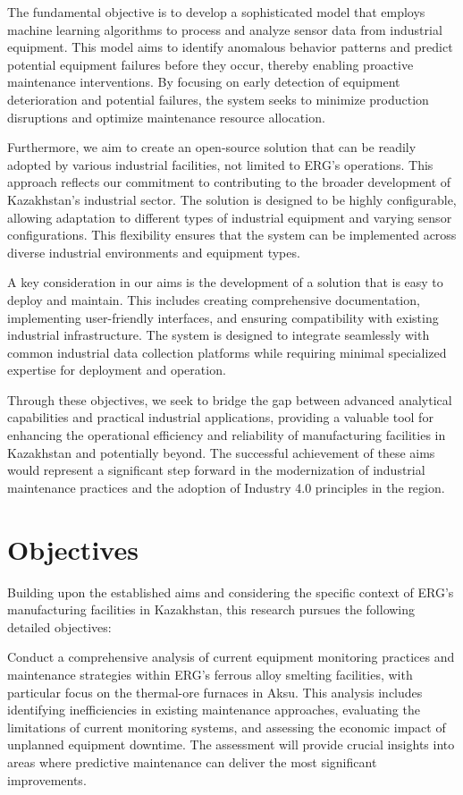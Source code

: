The fundamental objective is to develop a sophisticated model that employs machine learning algorithms to process and analyze sensor data from industrial equipment. This model aims to identify anomalous behavior patterns and predict potential equipment failures before they occur, thereby enabling proactive maintenance interventions. By focusing on early detection of equipment deterioration and potential failures, the system seeks to minimize production disruptions and optimize maintenance resource allocation.

Furthermore, we aim to create an open-source solution that can be readily adopted by various industrial facilities, not limited to ERG's operations. This approach reflects our commitment to contributing to the broader development of Kazakhstan's industrial sector. The solution is designed to be highly configurable, allowing adaptation to different types of industrial equipment and varying sensor configurations. This flexibility ensures that the system can be implemented across diverse industrial environments and equipment types.

A key consideration in our aims is the development of a solution that is easy to deploy and maintain. This includes creating comprehensive documentation, implementing user-friendly interfaces, and ensuring compatibility with existing industrial infrastructure. The system is designed to integrate seamlessly with common industrial data collection platforms while requiring minimal specialized expertise for deployment and operation.

Through these objectives, we seek to bridge the gap between advanced analytical capabilities and practical industrial applications, providing a valuable tool for enhancing the operational efficiency and reliability of manufacturing facilities in Kazakhstan and potentially beyond. The successful achievement of these aims would represent a significant step forward in the modernization of industrial maintenance practices and the adoption of Industry 4.0 principles in the region.

\section{Objectives}

Building upon the established aims and considering the specific context of ERG's manufacturing facilities in Kazakhstan, this research pursues the following detailed objectives:

Conduct a comprehensive analysis of current equipment monitoring practices and maintenance strategies within ERG's ferrous alloy smelting facilities, with particular focus on the thermal-ore furnaces in Aksu. This analysis includes identifying inefficiencies in existing maintenance approaches, evaluating the limitations of current monitoring systems, and assessing the economic impact of unplanned equipment downtime. The assessment will provide crucial insights into areas where predictive maintenance can deliver the most significant improvements.

